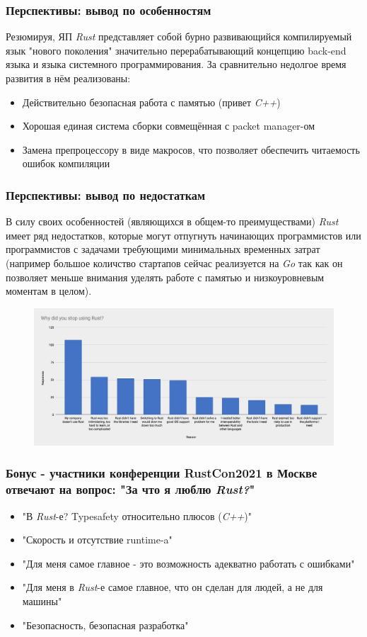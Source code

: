 \documentclass[11pt]{beamer}
\begin{document}
\begin{frame}
\frametitle{Перспективы: вывод по особенностям}
Резюмируя, ЯП \textit{Rust} представляет собой бурно развивающийся компилируемый язык "нового поколения" значительно перерабатывающий концепцию back-end языка и языка системного программирования. За сравнительно недолгое время развития в нём реализованы:
\begin{itemize} 
    \item Действительно безопасная работа с памятью (привет \textit{C++})
    \item Хорошая единая система сборки совмещённая с {\color{orange}packet manager-ом}
    \item Замена препроцессору в виде макросов, что позволяет обеспечить читаемость ошибок компиляции
\end{itemize}
\end{frame}
\begin{frame}
\frametitle{Перспективы: вывод по недостаткам}
В силу своих особенностей (являющихся в общем-то преимуществами) \textit{Rust} имеет ряд недостатков, которые могут отпугнуть начинающих программистов или программистов с задачами требующими минимальных временных затрат (например большое количство стартапов сейчас реализуется на \textit{Go} так как он позволяет меньше внимания уделять работе с памятью и низкоуровневым моментам в целом).
\begin{figure}
    \centering
    \includegraphics[width=0.9\linewidth]{image15.png}
\end{figure}
\end{frame}
\begin{frame}
\frametitle{Бонус - участники конференции RustCon2021 в Москве отвечают на вопрос: "За что я люблю \textit{Rust?}"}
\begin{itemize} 
    \item "В \textit{Rust}-е? Typesafety относительно плюсов (\textit{C++})"
    \item "Скорость и отсутствие runtime-a"
    \item "Для меня самое главное - это возможность адекватно работать с ошибками"
    \item "Для меня в \textit{Rust}-е самое главное, что он сделан для людей, а не для машины"
    \item "Безопасность, безопасная разработка"
\end{itemize}
\end{frame}
\end{document}
